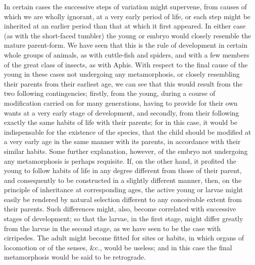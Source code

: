 \indent In certain cases the successive steps of variation might supervene, from causes of which we are wholly ignorant, at a very early period of life, or each step might be inherited at an earlier period than that at which it first appeared. In either case (as with the short-faced tumbler) the young or embryo would closely resemble the mature parent-form. We have seen that this is the rule of development in certain whole groups of animals, as with cuttle-fish and spiders, and with a few members of the great class of insects, as with Aphis. With respect to the final cause of the young in these cases not undergoing any metamorphosis, or closely resembling their parents from their earliest age, we can see that this would result from the two following contingencies; firstly, from the young, during a course of modification carried on for many generations, having to provide for their own wants at a very early stage of development, and secondly, from their following exactly the same habits of life with their parents; for in this case, it would be indispensable for the existence of the species, that the child should be modified at a very early age in the same manner with its parents, in accordance with their similar habits. Some further explanation, however, of the embryo not undergoing any metamorphosis is perhaps requisite. If, on the other hand, it profited the young to follow habits of life in any degree different from those of their parent, and consequently to be constructed in a slightly different manner, then, on the principle of inheritance at corresponding ages, the active young or larvae might easily be rendered by natural selection different to any conceivable extent from their parents. Such differences might, also, become correlated with successive stages of development; so that the larvae, in the first stage, might differ greatly from the larvae in the second stage, as we have seen to be the case with cirripedes. The adult might become fitted for sites or habits, in which organs of locomotion or of the senses, \&c., would be useless; and in this case the final metamorphosis would be said to be retrograde.~\\
